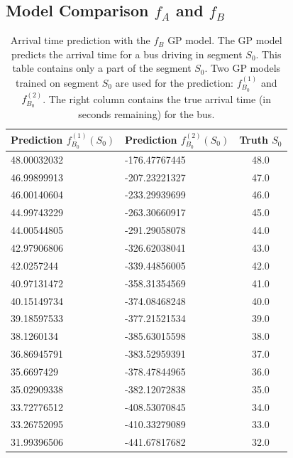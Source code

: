 \subsection{Model Comparison $f_A$ and $f_B$}
\begin{table}
    \centering
    \caption[Arrival time prediction with the $f_B$ GP model]%
    {{\small Arrival time prediction with the $f_B$ GP model.
    The GP model predicts the arrival time for a bus driving in segment $S_0$.
    This table contains only a part of the segment $S_0$.
    Two GP models trained on segment $S_0$ are used for the prediction: $f^{(1)}_{B_0}$ and $f^{(2)}_{B_0}$.
    The right column contains the true arrival time (in seconds remaining) for the bus.}}
    \label{table:f_B-examples} 
    \begin{tabular}{ |l|l|c| } 
        \hline
        Prediction $f^{(1)}_{B_0}(S_0)$ & Prediction $f^{(2)}_{B_0}(S_0)$ & Truth $S_0$ \\ [0.5ex] 
        \hline
        48.00032032 & -176.47767445 & 48.0 \\
        46.99899913 & -207.23221327 & 47.0 \\
        46.00140604 & -233.29939699 & 46.0 \\
        44.99743229 & -263.30660917 & 45.0 \\
        44.00544805 & -291.29058078 & 44.0 \\
        42.97906806 & -326.62038041 & 43.0 \\
        42.0257244 & -339.44856005 & 42.0 \\
        40.97131472 & -358.31354569 & 41.0 \\
        40.15149734 & -374.08468248 & 40.0 \\
        39.18597533 & -377.21521534 & 39.0 \\
        38.1260134 & -385.63015598 & 38.0 \\
        36.86945791 & -383.52959391 & 37.0 \\
        35.6697429 & -378.47844965 & 36.0 \\
        35.02909338 & -382.12072838 & 35.0 \\
        33.72776512 & -408.53070845 & 34.0 \\
        33.26752095 & -410.33279089 & 33.0 \\
        31.99396506 & -441.67817682 & 32.0 \\ 
        \hline
    \end{tabular}
\end{table}

